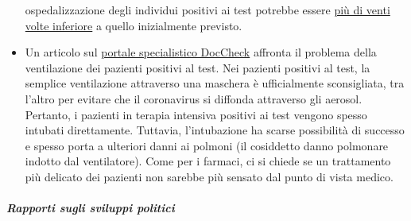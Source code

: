 \begin{itemize}
  ospedalizzazione degli individui positivi ai test potrebbe essere
  \href{https://www.nytimes.com/2020/03/27/nyregion/new-rochelle-coronavirus.html}{più
  di venti volte inferiore} a quello inizialmente previsto.
\item
  Un articolo sul
  \href{https://www.doccheck.com/de/detail/articles/26271-covid-19-beatmung-und-dann}{portale
  specialistico DocCheck} affronta il problema della ventilazione dei
  pazienti positivi al test. Nei pazienti positivi al test, la semplice
  ventilazione attraverso una maschera è ufficialmente sconsigliata, tra
  l'altro per evitare che il coronavirus si diffonda attraverso gli
  aerosol. Pertanto, i pazienti in terapia intensiva positivi ai test
  vengono spesso intubati direttamente. Tuttavia, l'intubazione ha
  scarse possibilità di successo e spesso porta a ulteriori danni ai
  polmoni (il cosiddetto danno polmonare indotto dal ventilatore). Come
  per i farmaci, ci si chiede se un trattamento più delicato dei
  pazienti non sarebbe più sensato dal punto di vista medico.
\end{itemize}

\hypertarget{rapporti-sugli-sviluppi-politici}{%
\subparagraph{\texorpdfstring{\textbf{Rapporti sugli sviluppi
politici}}{Rapporti sugli sviluppi politici}}\label{rapporti-sugli-sviluppi-politici}}

